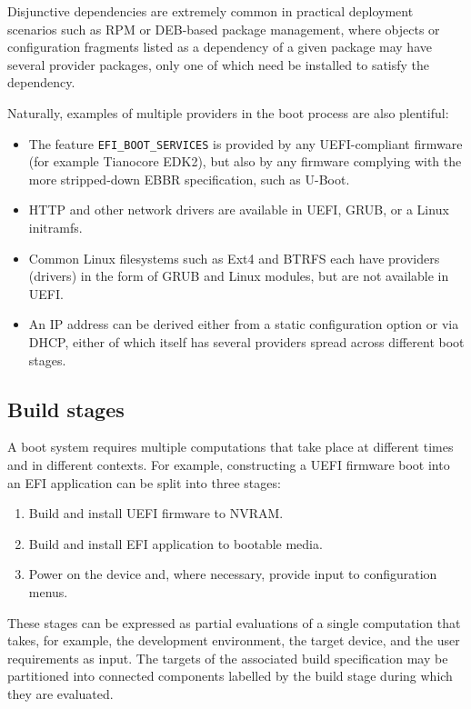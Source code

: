 Disjunctive dependencies are extremely common in practical deployment scenarios such as RPM or DEB-based package management, where objects or configuration fragments listed as a dependency of a given package may have several provider packages, only one of which need be installed to satisfy the dependency.

Naturally, examples of multiple providers in the boot process are also plentiful:

\begin{itemize}
  \item
    The feature \texttt{EFI\_BOOT\_SERVICES} is provided by any UEFI-compliant firmware (for example Tianocore EDK2), but also by any firmware complying with the more stripped-down EBBR specification, such as U-Boot.
  \item
    HTTP and other network drivers are available in UEFI, GRUB, or a Linux initramfs.
  \item
    Common Linux filesystems such as Ext4 and BTRFS each have providers (drivers) in the form of GRUB and Linux modules, but are not available in UEFI.
  \item
    An IP address can be derived either from a static configuration option or via DHCP, either of which itself has several providers spread across different boot stages.
\end{itemize}


\subsection{Build stages}

A boot system requires multiple computations that take place at different times and in different contexts. 
%
For example, constructing a UEFI firmware boot into an EFI application can be split into three stages:
\begin{enumerate}
  \item Build and install UEFI firmware to NVRAM.
  \item Build and install EFI application to bootable media.
  \item Power on the device and, where necessary, provide input to configuration menus.
\end{enumerate}
These stages can be expressed as partial evaluations of a single computation that takes, for example, the development environment, the target device, and the user requirements as input.
%
The targets of the associated build specification may be partitioned into connected components labelled by the build stage during which they are evaluated.

